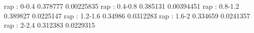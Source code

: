 rap : 0-0.4
0.378777 0.00225835
rap : 0.4-0.8
0.385131 0.00394451
rap : 0.8-1.2
0.389827 0.0225147
rap : 1.2-1.6
0.34986 0.0312283
rap : 1.6-2
0.334659 0.0241357
rap : 2-2.4
0.312383 0.0229315
